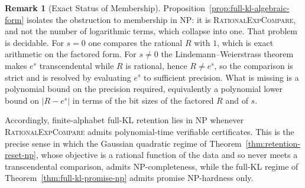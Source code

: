 \documentclass[12pt]{article}
\theoremstyle{definition}
\newtheorem{remark}[theorem]{Remark}
\begin{document}
\begin{remark}[Exact Status of Membership]
\label{rem:full-kl-exp-membership}
Proposition~\ref{prop:full-kl-algebraic-form} isolates the obstruction to
membership in NP: it is \textsc{RationalExpCompare}, and not the number of
logarithmic terms, which collapse into one.  That problem is decidable.  For
$s=0$ one compares the rational $R$ with $1$, which is exact arithmetic on the
factored form.  For $s\neq0$ the Lindemann--Weierstrass theorem makes $e^{s}$
transcendental while $R$ is rational, hence $R\neq e^{s}$, so the comparison is
strict and is resolved by evaluating $e^{s}$ to sufficient precision.  What is
missing is a polynomial bound on the precision required, equivalently a
polynomial lower bound on $|R-e^{s}|$ in terms of the bit sizes of the factored
$R$ and of $s$.

Accordingly, finite-alphabet full-KL retention lies in NP whenever
\textsc{RationalExpCompare} admits polynomial-time verifiable certificates.
This is the precise sense in which the Gaussian quadratic regime of
Theorem~\ref{thm:retention-reset-np}, whose objective is a rational function of
the data and so never meets a transcendental comparison, admits
NP-completeness, while the full-KL regime of
Theorem~\ref{thm:full-kl-promise-np} admits promise NP-hardness only.
\end{remark}
\end{document}
